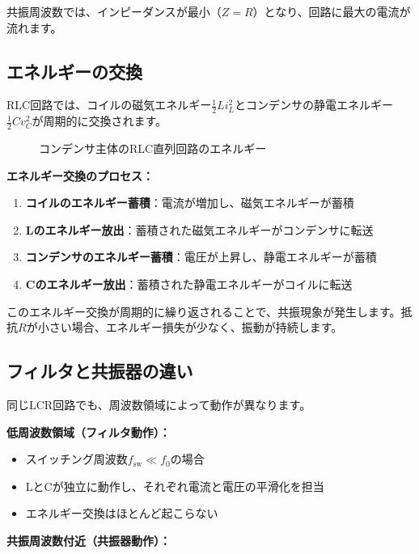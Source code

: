 共振周波数では、インピーダンスが最小（$Z = R$）となり、回路に最大の電流が流れます。

\subsection{エネルギーの交換}

RLC回路では、コイルの磁気エネルギー$\frac{1}{2}Li_L^2$とコンデンサの静電エネルギー$\frac{1}{2}Cv_C^2$が周期的に交換されます。

\begin{figure}[H]
\centering
{}
\caption{コンデンサ主体のRLC直列回路のエネルギー}
\label{fig:ch04_rlc_capacitor_dominant}
\end{figure}

\textbf{エネルギー交換のプロセス：}

\begin{enumerate}
\item \textbf{コイルのエネルギー蓄積}：電流が増加し、磁気エネルギーが蓄積
\item \textbf{Lのエネルギー放出}：蓄積された磁気エネルギーがコンデンサに転送
\item \textbf{コンデンサのエネルギー蓄積}：電圧が上昇し、静電エネルギーが蓄積
\item \textbf{Cのエネルギー放出}：蓄積された静電エネルギーがコイルに転送
\end{enumerate}

このエネルギー交換が周期的に繰り返されることで、共振現象が発生します。抵抗$R$が小さい場合、エネルギー損失が少なく、振動が持続します。

\subsection{フィルタと共振器の違い}

同じLCR回路でも、周波数領域によって動作が異なります。

\textbf{低周波数領域（フィルタ動作）：}

\begin{itemize}
\item スイッチング周波数$f_{\text{sw}} \ll f_0$の場合
\item LとCが独立に動作し、それぞれ電流と電圧の平滑化を担当
\item エネルギー交換はほとんど起こらない
\end{itemize}

\textbf{共振周波数付近（共振器動作）：}

